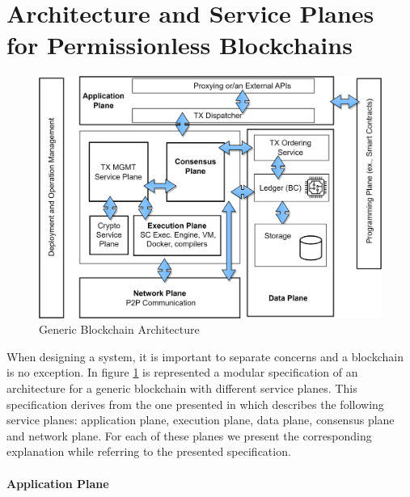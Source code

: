 \section{Architecture and Service Planes for Permissionless Blockchains}
\label{sec:background:arch_service_planes}


\begin{figure}[h]
    \centering
    \includegraphics[scale=0.55]{Chapters/Figures/drawio/blockchain_architecture.png}
    \caption{Generic Blockchain Architecture}
    \label{fig:blockchain_architecture}
\end{figure}

When designing a system, it is important to separate concerns and a blockchain is no exception. In figure \ref{fig:blockchain_architecture} is represented a modular specification of an architecture for a generic blockchain with different service planes. %
This specification derives from the one presented in \cite{systematic_survey_blockchain_systems} which describes the following service planes: application plane, execution plane, data plane, consensus plane and network plane. For each of these planes we present the corresponding explanation while referring to the presented specification.

\paragraph{Application Plane}

